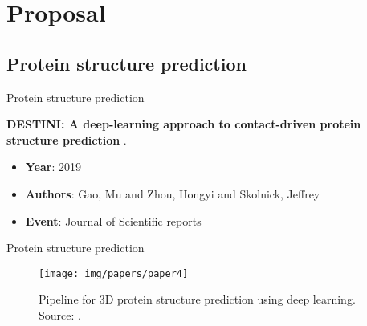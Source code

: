 \documentclass[10pt]{beamer}
\newcommand{\1}{
        	\setbeamertemplate{background}{
        		\texttt{[image: img/1]}
        		\tikz[overlay] \fill[fill opacity=0.75,fill=white] (0,0) rectangle (-\paperwidth,\paperheight);
        	}
}
\begin{document}
\section{Proposal}

\subsection{Protein structure prediction}

\begin{frame}{Protein structure prediction}{}
	
	\begin{block}{}
		\centering
		\textbf{DESTINI: A deep-learning approach to contact-driven protein structure prediction} \cite{gao2019destini}.
	\end{block}
	
	\begin{itemize}
		\item \textbf{Year}: 2019
		\item \textbf{Authors}: Gao, Mu and Zhou, Hongyi and Skolnick, Jeffrey
		\item \textbf{Event}: Journal of Scientific reports
	\end{itemize}
\end{frame}

\begin{frame}{Protein structure prediction}{}
	\begin{figure}
		\centering
		\texttt{[image: img/papers/paper4]}
		\caption{Pipeline for 3D protein structure prediction using deep learning. Source: \cite{ando2020practical}.}
	\end{figure}
\end{frame}
\end{document}
